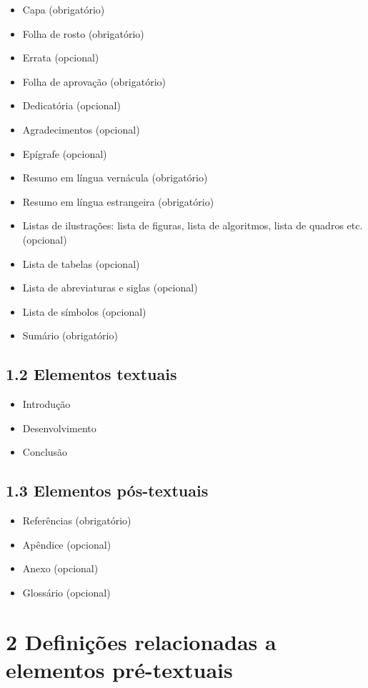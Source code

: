 \documentclass[
	12pt,				%
	oneside,			%
	a4paper,			%
	english,			%
	brazil				%
	]{abntex2ppgsi}
\begin{document}
\begin{anexosenv}
\begin{itemize}
	\item Capa (obrigatório)
	\item	Folha de rosto (obrigatório)
	\item	Errata (opcional)
	\item	Folha de aprovação (obrigatório)
	\item	Dedicatória (opcional)
	\item	Agradecimentos (opcional)
	\item	Epígrafe (opcional)
	\item	Resumo em língua vernácula (obrigatório)
	\item	Resumo em língua estrangeira (obrigatório)
	\item	Listas de ilustrações: lista de figuras, lista de algoritmos, lista de quadros etc. (opcional)
	\item	Lista de tabelas (opcional)
	\item	Lista de abreviaturas e siglas (opcional)
	\item	Lista de símbolos (opcional)
	\item	Sumário (obrigatório)
\end{itemize}

\subsection*{1.2 Elementos textuais}

\begin{itemize}
	\item	Introdução
	\item	Desenvolvimento
	\item	Conclusão
\end{itemize}

\subsection*{1.3 Elementos pós-textuais}

\begin{itemize}
	\item	Referências (obrigatório)
	\item	Apêndice (opcional)
	\item	Anexo (opcional)
	\item	Glossário (opcional)
\end{itemize}

\section*{2 Definições relacionadas a elementos pré-textuais}


\end{anexosenv}
\end{document}
